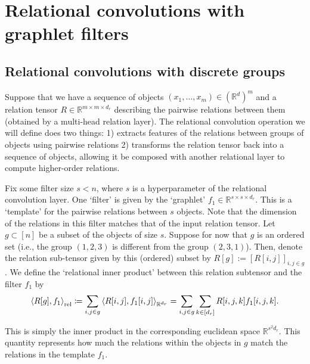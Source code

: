 \section{Relational convolutions with graphlet filters}\label{sec:relconv}

\subsection{Relational convolutions with discrete groups}
Suppose that we have a sequence of objects $(x_1, \ldots, x_m) \in (\mathbb{R}^{d})^m$ and a relation tensor $R \in \mathbb{R}^{m \times m \times d_r}$ describing the pairwise relations between them (obtained by a multi-head relation layer). The relational convolution operation we will define does two things: 1) extracts features of the relations between groups of objects using pairwise relations 2) transforms the relation tensor back into a sequence of objects, allowing it be composed with another relational layer to compute higher-order relations.

Fix some filter size $s < n$, where $s$ is a hyperparameter of the relational convolution layer. One `filter' is given by the `graphlet' $f_1 \in \mathbb{R}^{s \times s \times d_r}$. This is a `template' for the pairwise relations between $s$ objects. Note that the dimension of the relations in this filter matches that of the input relation tensor. Let $g \subset [n]$ be a subset of the objects of size $s$. Suppose for now that $g$ is an ordered set (i.e., the group $(1, 2, 3)$ is different from the group $(2, 3, 1)$). Then, denote the relation sub-tensor given by this (ordered) subset by $R[g] := [R[i,j]]_{i,j \in g}$. We define the `relational inner product' between this relation subtensor and the filter $f_1$ by
\begin{equation}
    \label{eq:relational_inner_prod_one_filt}
    \left\langle R[g], f_1 \right\rangle_\mathrm{rel} \coloneqq \sum_{i,j \in g} \left \langle R[i,j], f_1[i,j] \right\rangle_{\mathbb{R}^{d_r}} = \sum_{i,j \in g} \sum_{k \in [d_r]} R[i,j,k] f_1[i,j,k].
\end{equation}

This is simply the inner product in the corresponding euclidean space $\mathbb{R}^{s^2 d_r}$. This quantity represents how much the relations within the objects in $g$ match the relations in the template $f_1$.


